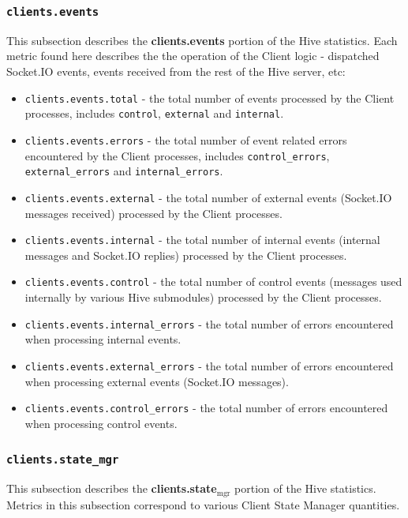 \documentclass[a4paper]{article}
\begin{document}
\subsubsection{\texttt{clients.events}}
\label{sec-4-2-6}

This subsection describes the \textbf{clients.events} portion of the Hive statistics. Each metric found here describes the the operation of the Client logic - dispatched Socket.IO events, events received from the rest of the Hive server, etc:


\begin{itemize}
\item \texttt{clients.events.total} - the total number of events processed by the Client processes, includes \texttt{control}, \texttt{external} and \texttt{internal}.
\item \texttt{clients.events.errors} - the total number of event related errors encountered by the Client processes, includes \texttt{control\_errors}, \texttt{external\_errors} and \texttt{internal\_errors}.
\item \texttt{clients.events.external} - the total number of external events (Socket.IO messages received) processed by the Client processes.
\item \texttt{clients.events.internal} - the total number of internal events (internal messages and Socket.IO replies) processed by the Client processes.
\item \texttt{clients.events.control} - the total number of control events (messages used internally by various Hive submodules) processed by the Client processes.
\item \texttt{clients.events.internal\_errors} - the total number of errors encountered when processing internal events.
\item \texttt{clients.events.external\_errors} - the total number of errors encountered when processing external events (Socket.IO messages).
\item \texttt{clients.events.control\_errors} - the total number of errors encountered when processing control events.
\end{itemize}
\subsubsection{\texttt{clients.state\_mgr}}
\label{sec-4-2-7}

This subsection describes the \textbf{clients.state$_{\mathrm{mgr}}$} portion of the Hive statistics. Metrics in this subsection correspond to various Client State Manager quantities.
\end{document}
